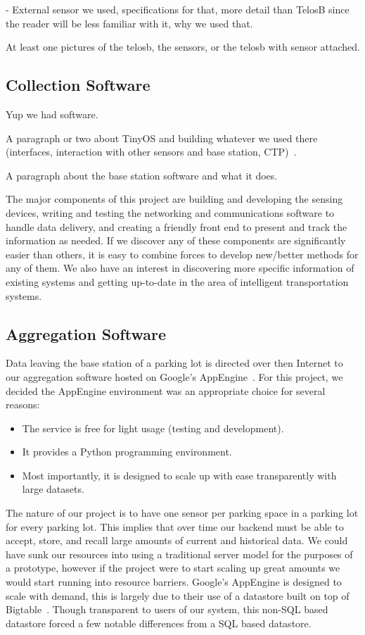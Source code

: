 \documentclass{acm_proc}
\begin{document}
- External sensor we used, specifications for that, more detail than
 TelosB since the reader will be less familiar with it, why we used that.

At least one pictures of the telosb, the sensors, or the telosb with sensor
attached.

\subsection{Collection Software}

Yup we had software.

A paragraph or two about TinyOS and building whatever we used there
(interfaces, interaction with other sensors and base
station, CTP)~\cite{tep119:collection}.

A paragraph about the base station software and what it does.

The major components of this project are building and developing the
sensing devices, writing and testing the networking and communications
software to handle data delivery, and creating a friendly front end to
present and track the information as needed.
If we discover any of these components are significantly easier than
others, it is easy to combine forces to develop new/better methods for any
of them.
We also have an interest in discovering more specific information of
existing systems and getting up-to-date in the area of intelligent
transportation systems.

\subsection{Aggregation Software}

Data leaving the base station of a parking lot is directed over then
Internet to our aggregation software hosted on Google's
AppEngine~\cite{google:appengine}.
For this project, we decided the AppEngine environment was an appropriate
choice for several reasons:
\begin{itemize}
	\item The service is free for light usage (testing and development).
	\item It provides a Python programming environment.
	\item Most importantly, it is designed to scale up with ease
	transparently with large datasets.
\end{itemize}

The nature of our project is to have one sensor per parking space in a
parking lot for every parking lot.
This implies that over time our backend must be able to accept, store, and
recall large amounts of current and historical data.
We could have sunk our resources into using a traditional server model for
the purposes of a prototype, however if the project were to start scaling
up great amounts we would start running into resource barriers.
Google's AppEngine is designed to scale with demand, this is largely due to
their use of a datastore built on top of Bigtable~\cite{google:bigtable}.
Though transparent to users of our system, this non-SQL based datastore
forced a few notable differences from a SQL based datastore.
\end{document}
